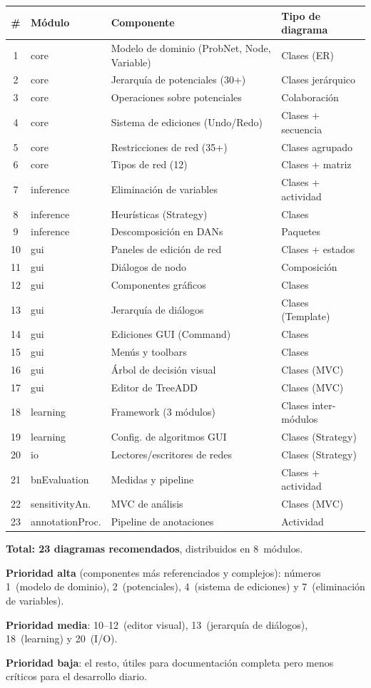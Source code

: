 \documentclass[11pt,a4paper]{article}
\begin{document}
\begin{longtable}{clp{5cm}l}
\toprule
\textbf{\#} & \textbf{M\'odulo} & \textbf{Componente} & \textbf{Tipo de diagrama} \\
\midrule
\endhead
1  & core & Modelo de dominio (ProbNet, Node, Variable) & Clases (ER) \\
2  & core & Jerarqu\'ia de potenciales (30+) & Clases jer\'arquico \\
3  & core & Operaciones sobre potenciales & Colaboraci\'on \\
4  & core & Sistema de ediciones (Undo/Redo) & Clases + secuencia \\
5  & core & Restricciones de red (35+) & Clases agrupado \\
6  & core & Tipos de red (12) & Clases + matriz \\
7  & inference & Eliminaci\'on de variables & Clases + actividad \\
8  & inference & Heur\'isticas (Strategy) & Clases \\
9  & inference & Descomposici\'on en DANs & Paquetes \\
10 & gui & Paneles de edici\'on de red & Clases + estados \\
11 & gui & Di\'alogos de nodo & Composici\'on \\
12 & gui & Componentes gr\'aficos & Clases \\
13 & gui & Jerarqu\'ia de di\'alogos & Clases (Template) \\
14 & gui & Ediciones GUI (Command) & Clases \\
15 & gui & Men\'us y toolbars & Clases \\
16 & gui & \'Arbol de decisi\'on visual & Clases (MVC) \\
17 & gui & Editor de TreeADD & Clases (MVC) \\
18 & learning & Framework (3 m\'odulos) & Clases inter-m\'odulos \\
19 & learning & Config. de algoritmos GUI & Clases (Strategy) \\
20 & io & Lectores/escritores de redes & Clases (Strategy) \\
21 & bnEvaluation & Medidas y pipeline & Clases + actividad \\
22 & sensitivityAn. & MVC de an\'alisis & Clases (MVC) \\
23 & annotationProc. & Pipeline de anotaciones & Actividad \\
\bottomrule
\end{longtable}

\textbf{Total: 23 diagramas recomendados}, distribuidos en 8~m\'odulos.

\textbf{Prioridad alta} (componentes m\'as referenciados y complejos):
n\'umeros 1~(modelo de dominio), 2~(potenciales), 4~(sistema de
ediciones) y 7~(eliminaci\'on de variables).

\textbf{Prioridad media}: 10--12~(editor visual), 13~(jerarqu\'ia de
di\'alogos), 18~(learning) y 20~(I/O).

\textbf{Prioridad baja}: el resto, \'utiles para documentaci\'on
completa pero menos cr\'iticos para el desarrollo diario.
\end{document}
